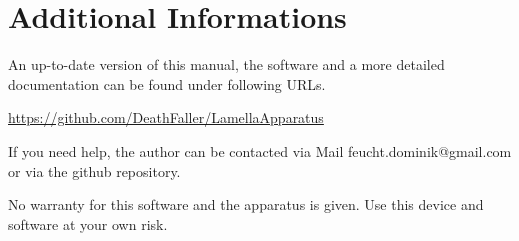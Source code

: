 \chapter{Additional Informations}

An up-to-date version of this manual, the software and a more detailed documentation can be found under following URLs.

\url{https://github.com/DeathFaller/LamellaApparatus}

If you need help, the author can be contacted via Mail feucht.dominik@gmail.com or via the github repository. 

No warranty for this software and the apparatus is given. 
Use this device and software at your own risk. 
